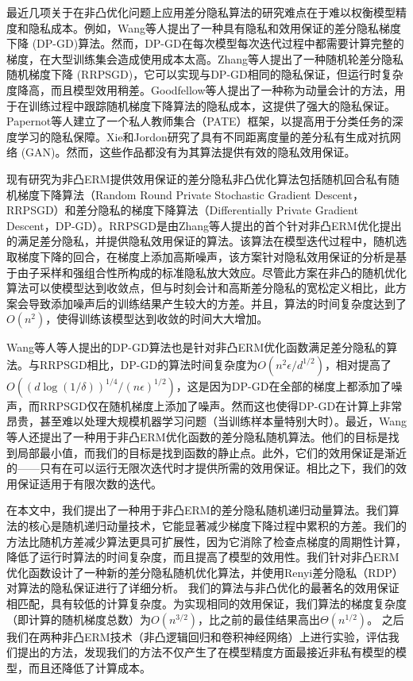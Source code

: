 最近几项关于在非凸优化问题上应用差分隐私算法的研究难点在于难以权衡模型精度和隐私成本。例如，Wang等人提出了一种具有隐私和效用保证的差分隐私梯度下降 (DP-GD)算法。然而，DP-GD在每次模型每次迭代过程中都需要计算完整的梯度，在大型训练集会造成使用成本太高。Zhang等人提出了一种随机轮差分隐私随机梯度下降 (RRPSGD)，它可以实现与DP-GD相同的隐私保证，但运行时复杂度降高，而且模型效用稍差。Goodfellow等人提出了一种称为动量会计的方法，用于在训练过程中跟踪随机梯度下降算法的隐私成本，这提供了强大的隐私保证。 Papernot等人建立了一个私人教师集合（PATE）框架，以提高用于分类任务的深度学习的隐私保障。Xie和Jordon研究了具有不同距离度量的差分私有生成对抗网络 (GAN)。然而，这些作品都没有为其算法提供有效的隐私效用保证。

现有研究为非凸ERM提供效用保证的差分隐私非凸优化算法包括随机回合私有随机梯度下降算法（Random Round Private Stochastic Gradient
Descent，RRPSGD）和差分隐私的梯度下降算法（Differentially Private Gradient Descent，DP-GD）。RRPSGD是由Zhang等人提出的首个针对非凸ERM优化提出的满足差分隐私，并提供隐私效用保证的算法。该算法在模型迭代过程中，随机选取梯度下降的回合，在梯度上添加高斯噪声，该方案针对隐私效用保证的分析是基于由子采样和强组合性所构成的标准隐私放大效应。尽管此方案在非凸的随机优化算法可以使模型达到收敛点，但与时刻会计和高斯差分隐私的宽松定义相比，此方案会导致添加噪声后的训练结果产生较大的方差。并且，算法的时间复杂度达到了$O\left(n^{2}\right)$，使得训练该模型达到收敛的时间大大增加。

Wang等人等人提出的DP-GD算法也是针对非凸ERM优化函数满足差分隐私的算法。与RRPSGD相比，DP-GD的算法时间复杂度为$O\left(n^{2} \epsilon / d^{1 / 2}\right)$，相对提高了$O\left((d \log (1 / \delta))^{1 / 4} /(n \epsilon)^{1 / 2}\right)$，这是因为DP-GD在全部的梯度上都添加了噪声，而RRPSGD仅在随机梯度上添加了噪声。然而这也使得DP-GD在计算上非常昂贵，甚至难以处理大规模机器学习问题（当训练样本量特别大时）。最近，Wang等人还提出了一种用于非凸ERM优化函数的差分隐私随机算法。他们的目标是找到局部最小值，而我们的目标是找到函数的静止点。此外，它们的效用保证是渐近的——只有在可以运行无限次迭代时才提供所需的效用保证。相比之下，我们的效用保证适用于有限次数的迭代。

在本文中，我们提出了一种用于非凸ERM的差分隐私随机递归动量算法。我们算法的核心是随机递归动量技术，它能显著减少梯度下降过程中累积的方差。我们的方法比随机方差减少算法更具可扩展性，因为它消除了检查点梯度的周期性计算，降低了运行时算法的时间复杂度，而且提高了模型的效用性。我们针对非凸ERM优化函数设计了一种新的差分隐私随机优化算法，并使用Renyi差分隐私（RDP）对算法的隐私保证进行了详细分析。 我们的算法与非凸优化的最著名的效用保证相匹配，具有较低的计算复杂度。为实现相同的效用保证，我们算法的梯度复杂度（即计算的随机梯度总数）为$O\left(n^{3 / 2}\right)$，比之前的最佳结果高出$\Theta\left(n^{1 / 2}\right)$。 之后我们在两种非凸ERM技术（非凸逻辑回归和卷积神经网络）上进行实验，评估我们提出的方法，发现我们的方法不仅产生了在模型精度方面最接近非私有模型的模型，而且还降低了计算成本。

